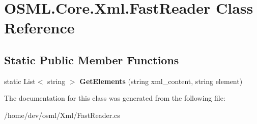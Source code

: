 \hypertarget{classOSML_1_1Core_1_1Xml_1_1FastReader}{}\section{O\+S\+M\+L.\+Core.\+Xml.\+Fast\+Reader Class Reference}
\label{classOSML_1_1Core_1_1Xml_1_1FastReader}
\subsection*{Static Public Member Functions}
\begin{DoxyCompactItemize}
\item 
\mbox{\label{classOSML_1_1Core_1_1Xml_1_1FastReader_ab3ac6ef5ab07ef6e66759bf21568a91b}} 
static List$<$ string $>$ {\bfseries Get\+Elements} (string xml\+\_\+content, string element)
\end{DoxyCompactItemize}


The documentation for this class was generated from the following file\+:\begin{DoxyCompactItemize}
\item 
/home/dev/osml/\+Xml/Fast\+Reader.\+cs\end{DoxyCompactItemize}

